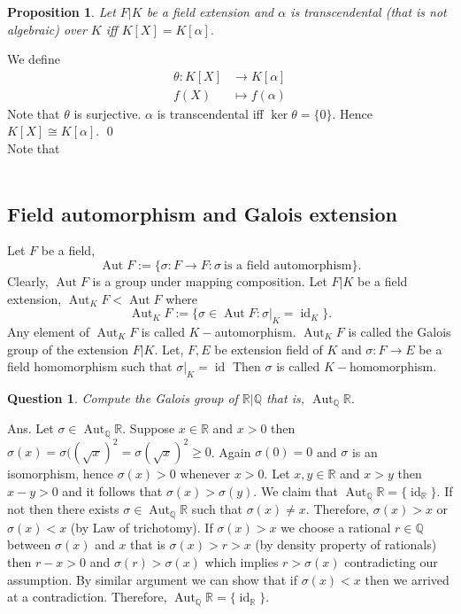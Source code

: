 \documentclass[11pt]{amsart}
\newtheorem{qns}[theorem]{Question}
\newtheorem{prop}[theorem]{Proposition}
\newcommand{\QQ}{\mathbb Q}
\newcommand{\RR}{\mathbb R}
\DeclareMathOperator{\aut}{\text{Aut}}
\DeclareMathOperator{\id}{\text{id}}
\begin{document}
\begin{prop}
Let $F|K$ be a field extension and $\alpha$ is transcendental (that is not algebraic) over $K$ iff $K[X]=K[\alpha].$
\end{prop}
\proof We define \begin{align*}
\theta:K[X]&\to K[\alpha]\\
f(X)&\mapsto f(\alpha)
\end{align*}
Note that $\theta$ is surjective. $\alpha$ is transcendental iff $\ker\theta=\{0\}.$ Hence $K[X]\cong K[\alpha].$ \qed\\
Note that \\\\


\subsection{Field automorphism and Galois extension}
Let $F$ be a field, $$\aut F:=\{\sigma:F\to F:\sigma~\text{is a field automorphism}\}.$$ Clearly, $\aut F$ is a group under mapping composition. Let $F|K$ be a field extension, $\aut_K F<\aut F$ where $$\aut_K F:=\{\sigma\in\aut F:\sigma|_K=\id_K\}.$$
Any element of $\aut_K F$ is called $K-$automorphism. $\aut_K F$ is called the Galois group of the extension $F|K.$ Let, $F,E$ be extension field of $K$ and $\sigma:F\to E$ be a field homomorphism such that $\sigma|_K=\id$ Then $\sigma$ is called $K-$homomorphism.
\begin{center}
\end{center}
\begin{qns}
Compute the Galois group of ${\RR}|{\QQ}$ that is, $\aut_{\QQ}{\RR}$.
\end{qns}
Ans. Let $\sigma\in \aut_{\QQ}{\RR}.$ Suppose $x\in {\RR}$ and $x>0$ then $\sigma(x)=\sigma((\sqrt{x})^2=\sigma(\sqrt{x})^2\geq 0$. Again $\sigma(0)=0$ and $\sigma$ is an isomorphism, hence $\sigma(x)>0$ whenever $x>0.$ Let $x,y\in {\RR}$ and $x>y$ then $x-y>0$ and it follows that $\sigma(x)>\sigma(y).$ We claim that $\aut_{\QQ}{\RR}=\{\id_{\RR}\}$. If not then there exists $\sigma\in \aut_{\QQ}{\RR}$ such that $\sigma(x)\neq x.$ Therefore, $\sigma(x)>x$ or $\sigma(x)<x$ (by Law of trichotomy). If $\sigma(x)>x$ we choose a rational $r\in {\QQ}$ between $\sigma(x)$ and $x$ that is $\sigma(x)>r>x$ (by density property of rationals) then $r-x>0$ and $\sigma(r)>\sigma(x)$ which implies $r>\sigma(x)$ contradicting our assumption. By similar argument we can show that if $\sigma(x)<x$ then we arrived at a contradiction. Therefore, $\aut_{\QQ}{\RR}=\{\id_{\RR}\}.$
\end{document}
